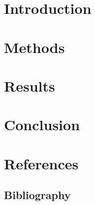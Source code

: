 \documentclass[letterpaper, oneside, 12pt]{report}
\begin{document}
    \begin{abstract}
    \end{abstract}
    \section{Introduction}
    \section{Methods}
    \section{Results}
    \section{Conclusion}
    \section{References}
    \subsection{Bibliography}
\end{document}
